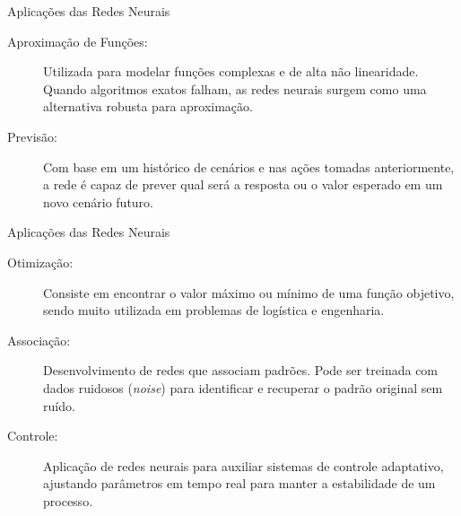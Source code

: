 \documentclass[aspectratio=169]{beamer}
\begin{document}
\begin{frame}{Aplicações das Redes Neurais }
	\justifying
	
	\begin{description}
		\item[Aproximação de Funções:] Utilizada para modelar funções complexas e de alta não linearidade. Quando algoritmos exatos falham, as redes neurais surgem como uma alternativa robusta para aproximação.
		
		\vspace{0.5cm}
		
		\item[Previsão:] Com base em um histórico de cenários e nas ações tomadas anteriormente, a rede é capaz de prever qual será a resposta ou o valor esperado em um novo cenário futuro.
	\end{description}
\end{frame}

\begin{frame}{Aplicações das Redes Neurais }
	\justifying
	
	\begin{description}
		\item[Otimização:] Consiste em encontrar o valor máximo ou mínimo de uma função objetivo, sendo muito utilizada em problemas de logística e engenharia.
		
		\vspace{0.3cm}
		
		\item[Associação:] Desenvolvimento de redes que associam padrões. Pode ser treinada com dados ruidosos (\textit{noise}) para identificar e recuperar o padrão original sem ruído.
		
		\vspace{0.3cm}
		
		\item[Controle:] Aplicação de redes neurais para auxiliar sistemas de controle adaptativo, ajustando parâmetros em tempo real para manter a estabilidade de um processo.
	\end{description}
\end{frame}
\end{document}
